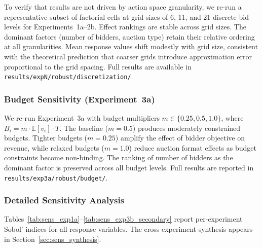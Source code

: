 To verify that results are not driven by action space granularity, we re-run a representative subset of factorial cells at grid sizes of 6, 11, and 21 discrete bid levels for Experiments~1a--2b. Effect rankings are stable across grid sizes. The dominant factors (number of bidders, auction type) retain their relative ordering at all granularities. Mean response values shift modestly with grid size, consistent with the theoretical prediction that coarser grids introduce approximation error proportional to the grid spacing. Full results are available in \texttt{results/expN/robust/discretization/}.

\subsubsection{Budget Sensitivity (Experiment~3a)}
\label{sec:budget_robust}

We re-run Experiment~3a with budget multipliers $m \in \{0.25, 0.5, 1.0\}$, where $B_i = m \cdot \mathbb{E}[v_i] \cdot T$. The baseline ($m = 0.5$) produces moderately constrained budgets. Tighter budgets ($m = 0.25$) amplify the effect of bidder objective on revenue, while relaxed budgets ($m = 1.0$) reduce auction format effects as budget constraints become non-binding. The ranking of number of bidders as the dominant factor is preserved across all budget levels. Full results are reported in \texttt{results/exp3a/robust/budget/}.

\subsubsection{Detailed Sensitivity Analysis}
\label{sec:appendix_sensitivity_tables}

Tables~\ref{tab:sens_exp1a}--\ref{tab:sens_exp3b_secondary} report per-experiment Sobol' indices for all response variables. The cross-experiment synthesis appears in Section~\ref{sec:sens_synthesis}.

